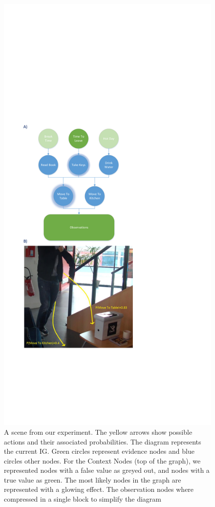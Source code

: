  \begin{figure}[h!]
	\centering
	\includegraphics[trim={2cm 11cm 11cm 17cm},clip,scale=0.45]{img/situation_assessment/cookieScenario.pdf}
	\caption{A scene from our experiment. The yellow arrows show possible actions and their associated probabilities. The diagram represents the current IG. Green circles represent evidence nodes and blue circles other nodes. For the Context Nodes (top of the graph), we represented nodes with a false value as greyed out, and nodes with a true value as green. The most likely nodes in the graph are represented with a glowing effect. The observation nodes where compressed in a single block to simplify the diagram}
	\label{fig:situation_assessment-intention_graph}
\end{figure}

